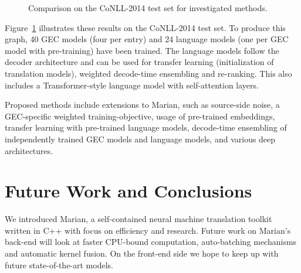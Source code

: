 \documentclass[11pt,a4paper]{article}
\begin{document}
\begin{figure}[t]
\caption{Comparison on the CoNLL-2014 test set for investigated methods.}\label{fig.all}
\end{figure}


Figure~\ref{fig.all} illustrates these results on the CoNLL-2014 test set. 
To produce this graph, 40 GEC models (four per entry) and 24 language models (one per GEC model with pre-training) have been trained.  The language models follow the decoder architecture and can be used for transfer learning (initialization of translation models), weighted decode-time ensembling and re-ranking. This also includes a Transformer-style language model with self-attention layers. 

Proposed methods include extensions to Marian, such as source-side noise, a GEC-specific weighted training-objective, usage of pre-trained embeddings, transfer learning with pre-trained language models, decode-time ensembling of independently trained GEC models and language models, and various deep architectures.

\section{Future Work and Conclusions}
We introduced Marian, a self-contained neural machine translation toolkit written in C++ with focus on efficiency and research. Future work on Marian's back-end will look at faster CPU-bound computation, auto-batching mechanisms and automatic kernel fusion. On the front-end side we hope to keep up with future state-of-the-art models.
\end{document}
